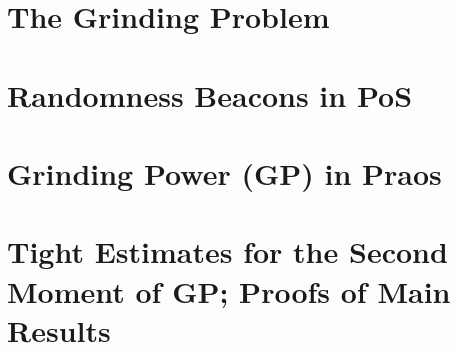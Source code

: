 


\chapter{The Grinding Problem}\label{ch:grinding-intro}


\chapter{Randomness Beacons in PoS}\label{sec:model-grinding}


% 

\chapter{Grinding Power (GP) in Praos}\label{sec:praos}



\chapter{Tight Estimates for the Second Moment of GP; Proofs of Main Results}\label{sec:praos-second-moment}\label{sec:main-theorems}




% 


% 


% 


% 


% 


% 



